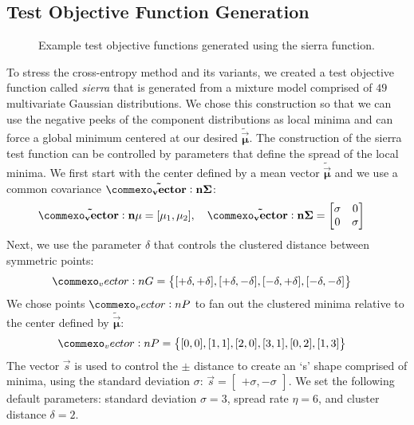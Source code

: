 \subsection{Test Objective Function Generation}
\begin{figure*}[!t]
  \centering
  \resizebox{0.8\textwidth}{!}{}
  \caption{
    \label{fig:sierra}
    Example test objective functions generated using the sierra function.  
  }
\end{figure*}
To stress the cross-entropy method and its variants, we created a test objective function called \textit{sierra} that is generated from a mixture model comprised of $49$ multivariate Gaussian distributions.
We chose this construction so that we can use the negative peeks of the component distributions as local minima and can force a global minimum centered at our desired $\mathbf{\tilde{\vec{\mu}}}$.
The construction of the sierra test function can be controlled by parameters that define the spread of the local minima.
We first start with the center defined by a mean vector $\mathbf{\tilde{\vec{\mu}}}$ and we use a common covariance $\mathbf{\tilde{\mat{\Sigma}}}$:
\begin{align*}
    \mathbf{\tilde{\vec{\mu}}} &= [\mu_1, \mu_2], \quad \mathbf{\tilde{\mat{\Sigma}}} = \begin{bmatrix}\sigma & 0\\ 0 & \sigma \end{bmatrix}
\end{align*}
Next, we use the parameter $\delta$ that controls the clustered distance between symmetric points:
\begin{align*}
    \mat{G} &= \left\{[+\delta, +\delta], [+\delta, -\delta], [-\delta, +\delta], [-\delta, -\delta]\right\}
\end{align*}
We chose points $\mat{P}$ to fan out the clustered minima relative to the center defined by $\mathbf{\tilde{\vec{\mu}}}$:
\begin{align*}
    \mat{P} &= \left\{[0, 0], [1, 1], [2, 0], [3, 1], [0, 2], [1, 3]\right\}
\end{align*}
The vector $\vec{s}$ is used to control the $\pm$ distance to create an `s' shape comprised of minima, using the standard deviation $\sigma$:
$\vec{s} = \begin{bmatrix}+\sigma, -\sigma \end{bmatrix}$.
We set the following default parameters: standard deviation $\sigma=3$, spread rate $\eta=6$, and cluster distance $\delta=2$.
